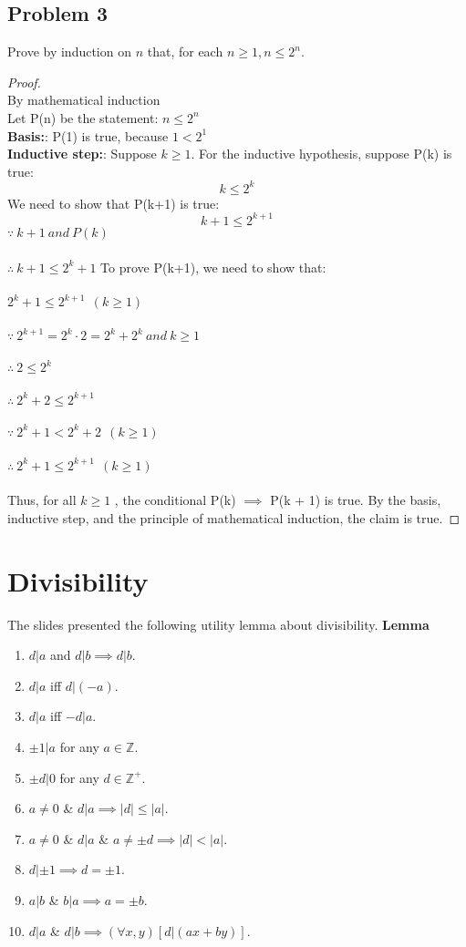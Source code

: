 \documentclass[paper=a4, fontsize=11pt]{scrartcl} %
\numberwithin{equation}{section} %
\numberwithin{figure}{section} %
\numberwithin{table}{section} %
\newcommand{\problem}[1]{\subsection *{Problem #1}}
\newcommand{\basis}{\textbf{Basis:}: }
\newcommand{\inductiveStep}{\textbf{Inductive step:}: }
\newcommand{\pnl}{$ $\newline\\}
\newcommand{\Z}{\mathbb{Z}}
\begin{document}
\problem 3
Prove by induction on $n$ that, for each $n \geq 1, n \leq 2^n.$
\begin{proof}
\pnl
By mathematical induction\\
Let P(n) be the statement: $n \leq 2^n$\\
\basis P(1) is true, because $1 < 2^1$\\
\inductiveStep Suppose $k \geq 1$. For the inductive hypothesis, suppose P(k) is true: \\
$$k \leq 2^k$$
We need to show that P(k+1) is true:
$$k+1 \leq 2^{k+1}$$
$\because \ k+1 \ and \ P(k)$\\\\
$\therefore \ k+1 \leq 2^k + 1$
To prove P(k+1), we need to show that:\\\\
$2^k + 1 \leq 2^{k+1} \ \ (k \geq 1)$\\\\
$\because \  2^{k+1} = 2^k \cdot 2 = 2^k + 2^k \ and \ k \geq 1$\\\\
$\therefore \ 2 \leq 2^k $\\\\
$\therefore \ 2^k + 2 \leq 2^{k+1} $\\\\
$\because \ 2^k + 1 < 2^k + 2 \ \ (k \geq 1)$\\\\
$\therefore \ 2^k + 1 \leq 2^{k+1} \ \ (k \geq 1)$\\\\

Thus, for all $k \geq 1$ , the conditional P(k) $\implies$ P(k + 1) is true.
By the basis, inductive step, and the principle of mathematical induction, the claim is true.
\end{proof}
\section {Divisibility}

The slides presented the following utility lemma about divisibility.
\newline
\newline
\textbf{Lemma}
\renewcommand{\labelenumi}{(\alph{enumi})}
\begin{enumerate}
  \item $d|a$ and $d|b \implies d|b$.
  \item $d|a$ iff $d|(-a)$.
  \item $d|a$ iff $-d|a$.
  \item $\pm 1|a$ for any $a \in \Z $.
  \item $\pm d|0$ for any $d \in \Z^+ $.
  \item $a \neq 0$ \& $d|a \implies |d| \leq |a|$.
  \item $a \neq 0$ \& $d|a$ \& $a \neq \pm d \implies |d| < |a|$.
  \item $d|\pm 1 \implies d = \pm 1$.
  \item $a|b$ \& $b|a \implies a = \pm b$.
  \item $d|a$ \& $d|b \implies (\forall x,y)[d|(ax+by)]$.
\end{enumerate}
\end{document}
